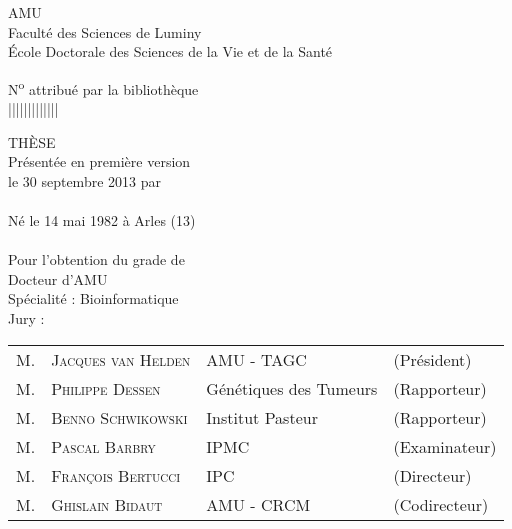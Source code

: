 \thispagestyle{empty}
  \begin{center}
    \avantgarLarge \acl{AMU}\\[1ex]
    \avantgar Faculté des Sciences de Luminy\\[1ex]
    \avantgar École Doctorale des Sciences de la Vie et de la Santé\\[3ex]
  \end{center}

  \begin{flushright}
    \avantgar N\textsuperscript{o} attribué par la bibliothèque\\[1ex]
    \avantgar |\textunderscore|\textunderscore|\textunderscore|\textunderscore|\textunderscore|\textunderscore|\textunderscore|\textunderscore|\textunderscore|\textunderscore|\textunderscore|\textunderscore|\\[1ex]
  \end{flushright}

  \begin{center}
    \avantgarboldHuge THÈSE\\[1.5ex]

    \avantgarlarge Présentée en première version\\[1ex]
    \avantgarlarge le 30 septembre 2013 par\\[1ex]
    \avantgarLarge \myauthor\\[1ex]
    \avantgar Né le 14 mai 1982 à Arles (13)\\[5ex]

    \avantgarboldHuge \mytitlefr\\[2ex]

    \avantgarlarge Pour l'obtention du grade de\\[1ex]
    \avantgarLarge Docteur d'\acl{AMU}\\[1ex]
    \avantgarlarge Spécialité : Bioinformatique\\[5ex]

    \avantgarlarge Jury :\\[1ex]
    \begin{tabular}{llll}
      {\Large M.} & {\Large\textsc{Jacques van Helden}}  & {\large \acs{AMU} - \acs{TAGC}}  & {\large(Président)}   \\
      {\Large M.} & {\Large\textsc{Philippe Dessen}}     & {\large Génétiques des Tumeurs}  & {\large(Rapporteur)}  \\
      {\Large M.} & {\Large\textsc{Benno Schwikowski}}   & {\large Institut Pasteur}        & {\large(Rapporteur)}  \\
      {\Large M.} & {\Large\textsc{Pascal Barbry}}       & {\large \acs{IPMC}}              & {\large(Examinateur)} \\
      {\Large M.} & {\Large\textsc{François Bertucci}}   & {\large \acs{IPC}}               & {\large(Directeur)}   \\
      {\Large M.} & {\Large\textsc{Ghislain Bidaut}}     & {\large \acs{AMU} - \acs{CRCM}}  & {\large(Codirecteur)} \\
    \end{tabular}
  \end{center}